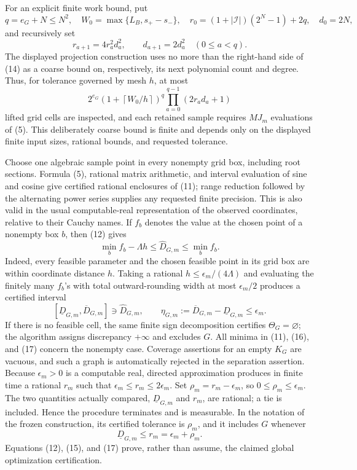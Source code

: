 For an explicit finite work bound, put
\[
 q=e_G+N\leq N^2,
 \quad W_0=\max\{L_B,s_+-s_-\},
 \quad r_0=(1+|\mathcal I|)(2^N-1)+2q,
 \quad d_0=2N,
\]
and recursively set
\[
 r_{a+1}=4r_a^2d_a^2,
 \qquad d_{a+1}=2d_a^2
 \quad(0\leq a<q).
 \tag{14}
\]
The displayed projection construction uses no more than the right-hand side
of (14) as a coarse bound on, respectively, its next polynomial count and
degree.  Thus, for tolerance governed by mesh \(h\), at most
\[
 2^{e_G}\left(1+\left\lceil W_0/h\right\rceil\right)^q
 \prod_{a=0}^{q-1}(2r_ad_a+1)
 \tag{15}
\]
lifted grid cells are inspected, and each retained sample requires \(MJ_m\)
evaluations of (5).  This deliberately coarse bound is finite and depends
only on the displayed finite input sizes, rational bounds, and requested
tolerance.

Choose one algebraic sample point in every nonempty grid box, including root
sections.  Formula (5), rational matrix arithmetic, and interval evaluation
of sine and cosine give certified rational enclosures of (11); range reduction
followed by the alternating power series supplies any requested finite
precision.  This is also valid in the usual computable-real representation
of the observed coordinates, relative to their Cauchy names.  If
\(f_b\) denotes the value at the chosen point of a nonempty box \(b\), then
(12) gives
\[
 \min_b f_b-\Lambda h
 \leq \widehat D_{G,m}\leq\min_b f_b.
 \tag{16}
\]
Indeed, every feasible parameter and the chosen feasible point in its grid
box are within coordinate distance \(h\).  Taking a rational
\(h\leq\epsilon_m/(4\Lambda)\) and evaluating the finitely many \(f_b\)'s
with total outward-rounding width at most \(\epsilon_m/2\) produces a
certified interval
\[
 [\underline D_{G,m},\overline D_{G,m}]
 \ni\widehat D_{G,m},
 \qquad
 \eta_{G,m}:=\overline D_{G,m}-\underline D_{G,m}\leq\epsilon_m.
 \tag{17}
\]
If there is no feasible cell, the same finite sign decomposition certifies
\(\Theta_G=\varnothing\); the algorithm assigns discrepancy \(+\infty\) and
excludes \(G\).  All minima in (11), (16), and (17) concern the nonempty case.
Coverage assertions for an empty \(K_G\) are vacuous, and such a graph is
automatically rejected in the separation assertion.
Because \(\epsilon_m>0\) is a computable real, directed approximation produces
in finite time a rational \(r_m\) such that
\(\epsilon_m\leq r_m\leq2\epsilon_m\).  Set
\(\rho_m=r_m-\epsilon_m\), so \(0\leq\rho_m\leq\epsilon_m\).  The two
quantities actually compared, \(\underline D_{G,m}\) and \(r_m\), are
rational; a tie is included.  Hence the procedure terminates and is
measurable.  In the notation of the frozen construction, its certified
tolerance is \(\rho_m\), and it includes \(G\) whenever
\[
 \underline D_{G,m}\leq r_m=\epsilon_m+\rho_m.
 \tag{18}
\]
Equations (12), (15), and (17) prove, rather than assume, the claimed global
optimization certification.

